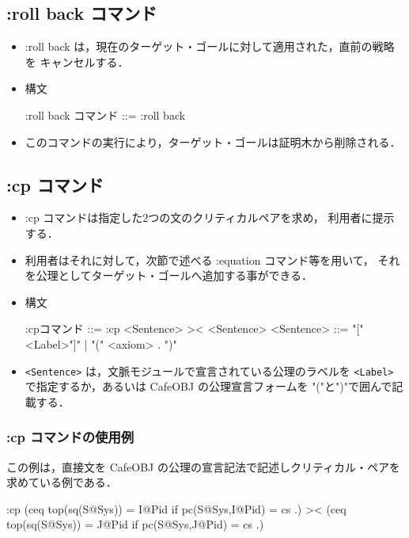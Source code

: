 \documentclass[a4paper,oneside,10pt,here]{memoir}
\newenvironment{vvtm}%
{\parskip=0pt\lineskip=0pt\begin{center}\begin{minipage}{0.8\textwidth}\begin{snugshade}}%
  {\end{snugshade}\end{minipage}\end{center}}
\begin{document}
\subsection{:roll back コマンド}

\begin{itemize}
\item :roll back は，現在のターゲット・ゴールに対して適用された，直前の戦略を
  キャンセルする．
\item 構文
  \begin{vvtm}
    \begin{simplev}
      :roll back コマンド ::= :roll back
    \end{simplev}
  \end{vvtm}
\item このコマンドの実行により，ターゲット・ゴールは証明木から削除される．
\end{itemize}

\subsection{:cp コマンド}

\begin{itemize}
\item :cp コマンドは指定した2つの文のクリティカルペアを求め，
  利用者に提示する．
\item 利用者はそれに対して，次節で述べる :equation コマンド等を用いて，
  それを公理としてターゲット・ゴールへ追加する事ができる．
\item 構文
  \begin{vvtm}
    \begin{simplev}
      :cpコマンド ::= :cp <Sentence> >< <Sentence>
      <Sentence>  ::= "["<Label>"]" | "(" <axiom> . ")"
    \end{simplev}
  \end{vvtm}
\item \verb|<Sentence>| は，文脈モジュールで宣言されている公理のラベルを
  \verb|<Label>| で指定するか，あるいは CafeOBJ の公理宣言フォームを
  "("と")"で囲んで記載する．
\end{itemize}

\subsubsection{:cp コマンドの使用例}
この例は，直接文を CafeOBJ の公理の宣言記法で記述しクリティカル・ペアを
求めている例である．
\begin{vvtm}
  \begin{simplev}
:cp (ceq top(sq(S@Sys)) = I@Pid if pc(S@Sys,I@Pid) = cs .) 
    >< 
    (ceq top(sq(S@Sys)) = J@Pid if pc(S@Sys,J@Pid) = cs .)
  \end{simplev}
\end{vvtm}
\end{document}

